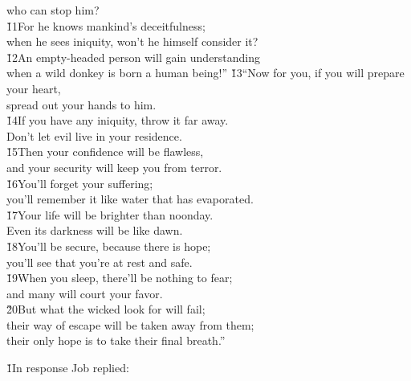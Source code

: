 \begin{poetry}
\poemll    who can stop him? \\
\poeml \v{11}For he knows mankind's deceitfulness; \\
\poemll    when he sees iniquity, won't he himself consider it? \\
\poeml \v{12}An empty-headed person will gain understanding \\
\poemll    when a wild donkey is born a human being!''
\poeml \v{13}``Now for you, if you will prepare your heart, \\
\poemll    spread out your hands to him. \\
\poeml \v{14}If you have any iniquity, throw it far away. \\
\poemll    Don't let evil live in your residence. \\
\poeml \v{15}Then your confidence will be flawless, \\
\poemll    and your security will keep you from terror. \\
\poeml \v{16}You'll forget your suffering; \\
\poemll    you'll remember it like water that has evaporated. \\
\poeml \v{17}Your life will be brighter than noonday. \\
\poemll    Even its darkness will be like dawn. \\
\poeml \v{18}You'll be secure, because there is hope; \\
\poemll    you'll see that you're at rest and safe. \\
\poeml \v{19}When you sleep, there'll be nothing to fear; \\
\poemll    and many will court your favor. \\
\poeml \v{20}But what the wicked look for will fail; \\
\poemll    their way of escape will be taken away from them; \\
\poemlll       their only hope is to take their final breath.''
\end{poetry}

\v{1}In response Job replied:

